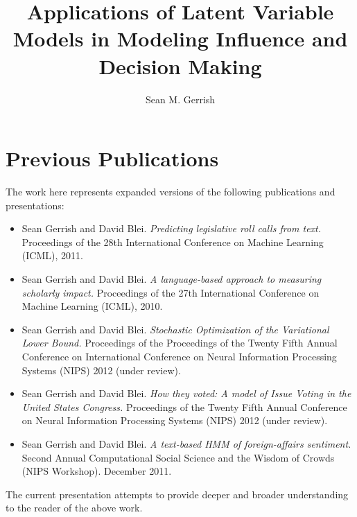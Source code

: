 \documentclass[table]{puthesis}
\author{Sean M. Gerrish}
\title{Applications of Latent Variable Models in Modeling Influence and Decision Making}
\begin{document}

\section*{Previous Publications}
The work here represents expanded versions of the following publications and presentations:
\begin{itemize}
\item Sean Gerrish and David Blei. \emph{Predicting legislative roll
    calls from text.} Proceedings of the 28th International Conference
  on Machine Learning (ICML), 2011.
\item Sean Gerrish and David Blei. \emph{A language-based approach to
    measuring scholarly impact.}  Proceedings of the 27th
  International Conference on Machine Learning (ICML), 2010.
\item Sean Gerrish and David Blei. \emph{Stochastic Optimization of
    the Variational Lower Bound.} Proceedings of the Proceedings of
  the Twenty Fifth Annual Conference on International Conference on
  Neural Information Processing Systems (NIPS) 2012 (under review).
\item Sean Gerrish and David Blei. \emph{How they voted: A model of
    Issue Voting in the United States Congress.}  Proceedings of the
  Twenty Fifth Annual Conference on Neural Information Processing
  Systems (NIPS) 2012 (under review).
\item Sean Gerrish and David Blei. \emph{A text-based HMM of
    foreign-affairs sentiment.} Second Annual Computational Social
  Science and the Wisdom of Crowds (NIPS Workshop).  December 2011.
\end{itemize}

The current presentation attempts to provide deeper and broader
understanding to the reader of the above work.









%


% 

%





%


\end{document}
